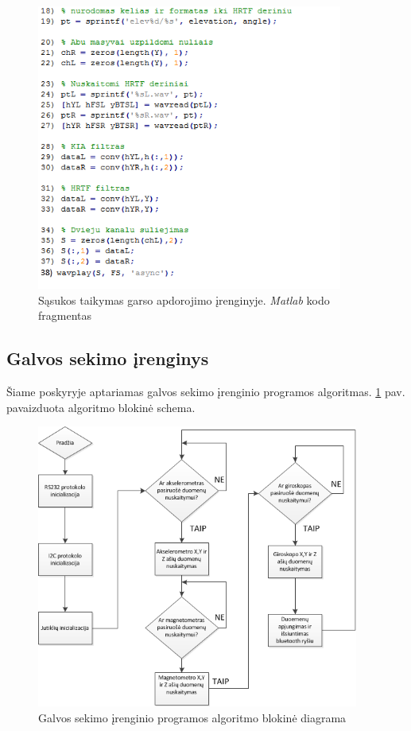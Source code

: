 \documentclass[]{vgtuef}
\begin{document}
\begin{figure}[!h]
  \centering
  \includegraphics[width=380px]{img/conv2.png}
  \caption{Sąsukos taikymas garso apdorojimo įrenginyje. \textit{Matlab} kodo fragmentas}
\end{figure}

%  

\newpage

\subsection{Galvos sekimo įrenginys}

Šiame poskyryje aptariamas galvos sekimo įrenginio programos algoritmas. \ref{fig:head_tracker} pav. pavaizduota algoritmo blokinė schema.

\begin{figure}[!ht]
  \centering
  \includegraphics[width=400px]{img/head_tracker.png}
  \caption{Galvos sekimo įrenginio programos algoritmo blokinė diagrama}
  \label{fig:head_tracker}
\end{figure}
\end{document}
